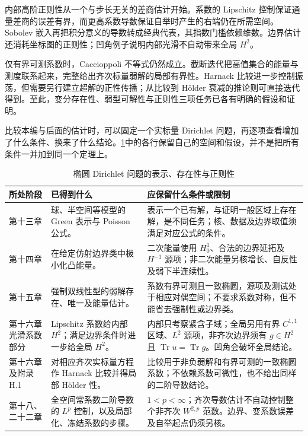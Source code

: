 



\begin{chaptersummary}
内部高阶正则性从一个与步长无关的差商估计开始。系数的 Lipschitz 控制保证通量差商的误差有界，而更高系数导数保证自举时产生的右端仍在所需空间。Sobolev 嵌入再把积分意义的导数转成经典代表，其指数门槛依赖维数。边界估计还消耗坐标图的正则性；凹角例子说明内部光滑不自动带来全局 \(H^2\)。

\ProseParagraphBreak

仅有界可测系数时，Caccioppoli 不等式仍然成立。截断迭代把高值集合的能量与测度联系起来，完整给出齐次标量弱解的局部有界性。Harnack 比较进一步控制振荡，但需要另行建立超解的正性传播；从比较到 Hölder 衰减的推论则可直接迭代得到。至此，变分存在性、弱型可解性与正则性三项任务已各有明确的假设和证明。
\end{chaptersummary}

比较本编与后面的估计时，可以固定一个实标量 Dirichlet 问题，再逐项查看增加了什么条件、换来了什么结论。\cref{b2:tab:16-dirichlet-levels}中的各行保留自己的空间和假设，并不是把所有条件一并加到同一个定理上。

\begin{table}[htbp]
\centering
\small
\caption[椭圆 Dirichlet 问题的各层结论]{椭圆 Dirichlet 问题的表示、存在性与正则性}
\label{b2:tab:16-dirichlet-levels}
\begin{tabularx}{\textwidth}{@{}p{}XX@{}}
\toprule
所处阶段 & 已得到什么 & 应保留什么条件或限制 \\
\midrule
第十三章 & 球、半空间等模型的 Green 表示与 Poisson 公式。 & 表示一个已有解，与证明一般区域上存在解，是不同任务；核、数据及边界取值须满足对应公式的条件。 \\
第十四章 & 在给定仿射边界类中极小化凸能量。 & 二次能量使用 \(H_0^1\)、合法的边界延拓及 \(H^{-1}\) 源项；非二次能量另核增长、自反性及弱下半连续性。 \\
第十五章 & 强制双线性型的弱解存在、唯一及能量估计。 & 系数有界可测且一致椭圆，源项及测试处于相应对偶空间；不要求系数对称，但不能省去强制性或边界类。 \\
第十六章光滑系数部分 & Lipschitz 系数给内部 \(H^2\)；满足边界条件时进一步给全局 \(H^2\)。 & 内部只考察紧含子域；全局另用有界 \(C^{1,1}\) 区域、\(L^2\) 源项，非齐次边界须有 \(g\in H^2\) 且 \(\operatorname{Tr}u=\operatorname{Tr}g\)。凹角会破坏全局结论。 \\
第十六章及附录 H.1 & 对相应齐次实标量方程作 Harnack 比较并得局部 Hölder 性。 & 比较用于非负弱解和有界可测的一致椭圆系数；不依赖系数可微性，也不给出同样的二阶导数结论。 \\
第十八、二十二章 & 全空间常系数二阶导数的 \(L^p\) 控制，以及局部化、冻结系数的步骤。 & \(1<p<\infty\)；齐次导数估计不自动控制整个非齐次 \(W^{2,p}\) 范数。边界、变系数误差及自举起点仍须另核。 \\
\bottomrule
\end{tabularx}
\end{table}

